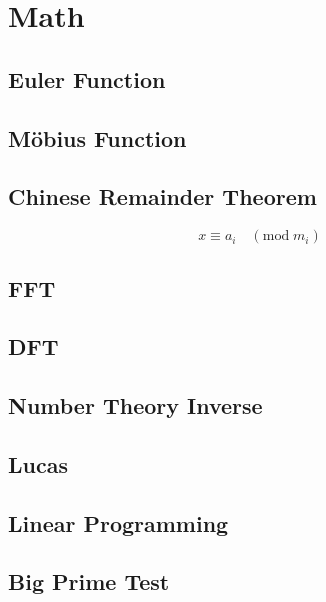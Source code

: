 \section{Math}

\subsection{Euler Function}


\subsection{Möbius Function}


\subsection{Chinese Remainder Theorem}
\[
	x \equiv a_i \quad (\mathrm{mod}\;m_i)
\]


\subsection{FFT}


\subsection{DFT}

\subsection{Number Theory Inverse}


\subsection{Lucas}


\subsection{Linear Programming}


\subsection{Big Prime Test}

